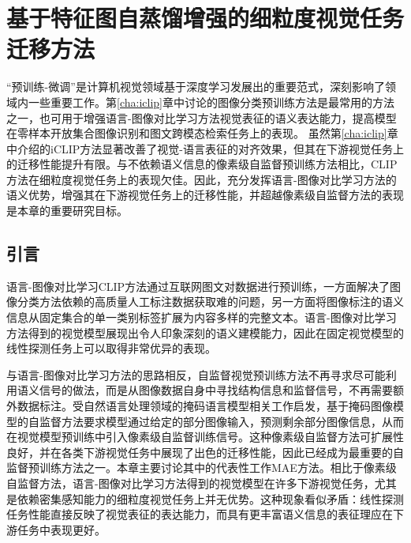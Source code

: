 \chapter{基于特征图自蒸馏增强的细粒度视觉任务迁移方法}
\label{cha:fd}

“预训练-微调”是计算机视觉领域基于深度学习发展出的重要范式，深刻影响了领域内一些重要工作\cite{HinSal06,alexnet,rcnn13,long2015fully}。第\ref{cha:iclip}章中讨论的图像分类预训练方法是最常用的方法之一，也可用于增强语言-图像对比学习方法视觉表征的语义表达能力，提高模型在零样本开放集合图像识别和图文跨模态检索任务上的表现。
虽然第\ref{cha:iclip}章中介绍的iCLIP方法显著改善了视觉-语言表征的对齐效果，但其在下游视觉任务上的迁移性能提升有限。与不依赖语义信息的像素级自监督预训练方法\cite{he2022masked}相比，CLIP方法在细粒度视觉任务上的表现欠佳。因此，充分发挥语言-图像对比学习方法的语义优势，增强其在下游视觉任务上的迁移性能，并超越像素级自监督方法的表现是本章的重要研究目标。



\section{引言}
\label{sec:fd-intro}

语言-图像对比学习CLIP方法通过互联网图文对数据进行预训练，一方面解决了图像分类方法依赖的高质量人工标注数据获取难的问题，另一方面将图像标注的语义信息从固定集合的单一类别标签扩展为内容多样的完整文本。语言-图像对比学习方法得到的视觉模型展现出令人印象深刻的语义建模能力，因此在固定视觉模型的线性探测任务上可以取得非常优异的表现。%

与语言-图像对比学习方法的思路相反，自监督视觉预训练方法不再寻求尽可能利用语义信号的做法，而是从图像数据自身中寻找结构信息和监督信号，不再需要额外数据标注。受自然语言处理领域的掩码语言模型\cite{BERT}相关工作启发，基于掩码图像模型\cite{bao2021beit, xie2022simmim, he2022masked}的自监督方法要求模型通过给定的部分图像输入，预测剩余部分图像信息，从而在视觉模型预训练中引入像素级自监督训练信号。这种像素级自监督方法可扩展性良好，并在各类下游视觉任务中展现了出色的迁移性能，因此已经成为最重要的自监督预训练方法之一。本章主要讨论其中的代表性工作MAE\cite{he2022masked}方法。相比于像素级自监督方法，语言-图像对比学习方法得到的视觉模型在许多下游视觉任务，尤其是依赖密集感知能力的细粒度视觉任务上并无优势。这种现象看似矛盾：线性探测任务性能直接反映了视觉表征的表达能力，而具有更丰富语义信息的表征理应在下游任务中表现更好。

